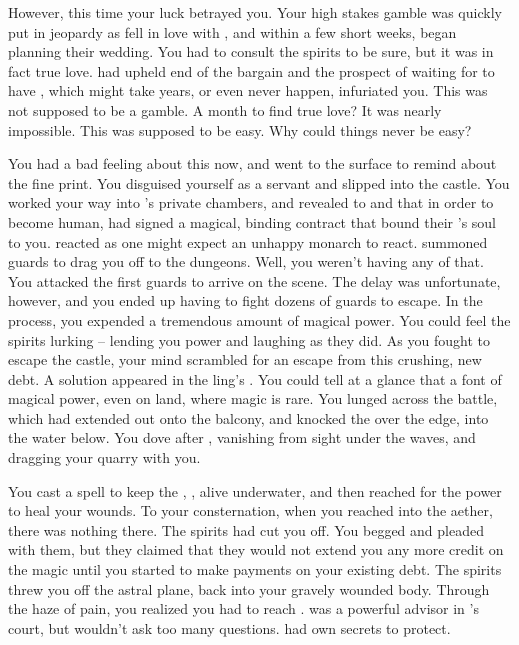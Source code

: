 \documentclass[char]{NeptuneBall}
\begin{document}
However, this time your luck betrayed you. Your high stakes gamble was quickly put in jeopardy as \cEric{} fell in love with \cAriel{}, and within a few short weeks, began planning their wedding. You had to consult the spirits to be sure, but it was in fact true love. \cAriel{} had upheld \cAriel{\their} end of the bargain and the prospect of waiting for \cAriel{\them} to have , which might take years, or even never happen, infuriated you. This was not supposed to be a gamble. A month to find true love? It was nearly impossible. This was supposed to be easy. Why could things never be easy?

You had a bad feeling about this now, and went to the surface to remind \cAriel{} about the fine print. You disguised yourself as a servant and slipped into the castle. You worked your way into \cEric{}'s private chambers, and revealed to \cAriel{} and \cEric{} that in order to become human, \cAriel{} had signed a magical, binding contract that bound their 's soul to you. \cEric{} reacted as one might expect an unhappy monarch to react. \cEric{\They} summoned \cEric{\their} guards to drag you off to the dungeons. Well, you weren't having any of that. You attacked the first guards to arrive on the scene. The delay was unfortunate, however, and you ended up having to fight dozens of guards to escape. In the process, you expended a tremendous amount of magical power. You could feel the spirits lurking -- lending you power and laughing as they did. As you fought to escape the castle, your mind scrambled for an escape from this crushing, new debt. A solution appeared in the \cEric{\prince}ling's \cSlave{\sibling}. You could tell at a glance that \cSlave{\they} \cSlave{\were} a font of magical power, even on land, where magic is rare. You lunged across the battle, which had extended out onto the balcony, and knocked the \cSlave{\kid} over the edge, into the water below. You dove after \cSlave{\them}, vanishing from sight under the waves, and dragging your quarry with you.

You cast a spell to keep the \cSlave{\kid}, \cSlave{}, alive underwater, and then reached for the power to heal your wounds. To your consternation, when you reached into the aether, there was nothing there. The spirits had cut you off. You begged and pleaded with them, but they claimed that they would not extend you any more credit on the magic until you started to make payments on your existing debt. The spirits threw you off the astral plane, back into your gravely wounded body. Through the haze of pain, you realized you had to reach \cManta{}. \cManta{} was a powerful advisor in \cKing{}'s court, but \cManta{\they} wouldn't ask too many questions. \cManta{\They} had \cManta{\their} own secrets to protect.
\end{document}
